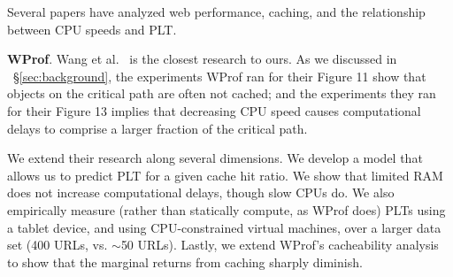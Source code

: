 

Several papers have analyzed web performance, caching, and the relationship
between CPU speeds and PLT.

\textbf{WProf}. Wang et al.~\cite{wang2013demystifying} is the closest research to ours. As we discussed in ~\S\ref{sec:background}, the experiments WProf ran for their Figure 11 show that objects on the critical path are often not cached; and the experiments they ran for their
Figure 13 implies that decreasing CPU speed causes computational delays to comprise a larger fraction of the critical path.

We extend their research along several dimensions.
We develop a model that allows us to predict PLT for a given cache hit ratio. We show that limited RAM does not increase computational delays, though slow CPUs do. We also empirically measure (rather than statically compute, as WProf does) PLTs using a tablet device, and using CPU-constrained virtual machines, over a larger data set (400 URLs, vs. {\footnotesize$\sim$}50 URLs).
Lastly, we extend WProf's cacheability analysis to show that the
marginal returns from caching sharply diminish.



